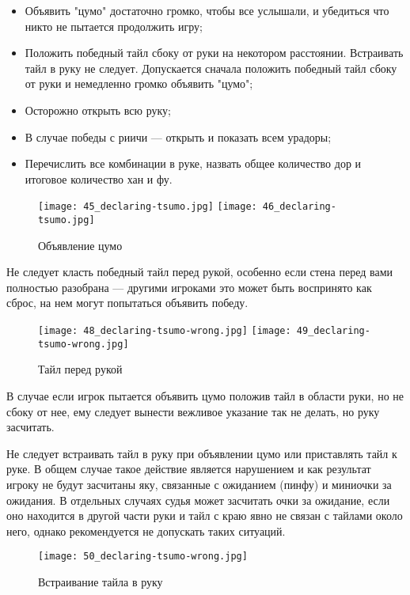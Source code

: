 \begin{itemize}
	\item Объявить "цумо" достаточно громко, чтобы все услышали, и убедиться что никто не пытается продолжить игру;
	\item Положить победный тайл сбоку от руки на некотором расстоянии. Встраивать тайл в руку не следует. Допускается сначала положить победный тайл сбоку от руки и немедленно громко объявить "цумо";
	\item Осторожно открыть всю руку;
	\item В случае победы с риичи --- открыть и показать всем урадоры;
	\item Перечислить все комбинации в руке, назвать общее количество дор и итоговое количество хан и фу.
\end{itemize}

\begin{figure}[H]
	\centering
	\texttt{[image: 45\_declaring-tsumo.jpg]}
	\texttt{[image: 46\_declaring-tsumo.jpg]}
	\caption{Объявление цумо}
\end{figure}

Не следует класть победный тайл перед рукой, особенно если стена перед вами полностью разобрана --- другими игроками это может быть воспринято как сброс, на нем могут попытаться объявить победу.

\begin{figure}[H]
	\centering
	\texttt{[image: 48\_declaring-tsumo-wrong.jpg]}
	\texttt{[image: 49\_declaring-tsumo-wrong.jpg]}
	\caption{Тайл перед рукой}
\end{figure}

В случае если игрок пытается объявить цумо положив тайл в области руки, но не сбоку от нее, ему следует вынести вежливое указание так не делать, но руку засчитать. 

Не следует встраивать тайл в руку при объявлении цумо или приставлять тайл к руке. В общем случае такое действие является нарушением и как результат игроку не будут засчитаны яку, связанные с ожиданием (пинфу) и миниочки за ожидания. В отдельных случаях судья может засчитать очки за ожидание, если оно находится в другой части руки и тайл с краю явно не связан с тайлами около него, однако рекомендуется не допускать таких ситуаций.

\begin{figure}[H]
	\centering
	\texttt{[image: 50\_declaring-tsumo-wrong.jpg]}
	\caption{Встраивание тайла в руку}
\end{figure}

